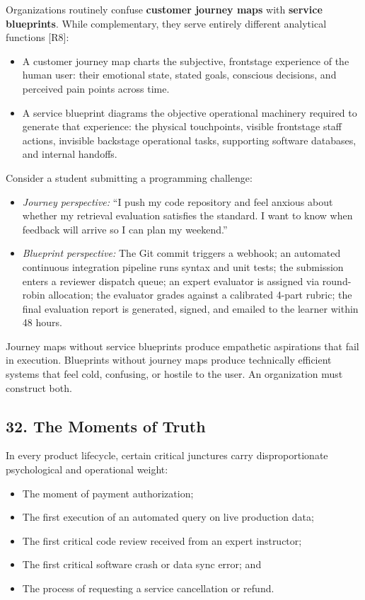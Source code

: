 Organizations routinely confuse \textbf{customer journey maps} with \textbf{service blueprints}. While complementary, they serve entirely different analytical functions [R8]:
\begin{itemize}
    \item A customer journey map charts the subjective, frontstage experience of the human user: their emotional state, stated goals, conscious decisions, and perceived pain points across time.
    \item A service blueprint diagrams the objective operational machinery required to generate that experience: the physical touchpoints, visible frontstage staff actions, invisible backstage operational tasks, supporting software databases, and internal handoffs.
\end{itemize}

Consider a student submitting a programming challenge:
\begin{itemize}
    \item \emph{Journey perspective:} ``I push my code repository and feel anxious about whether my retrieval evaluation satisfies the standard. I want to know when feedback will arrive so I can plan my weekend.''
    \item \emph{Blueprint perspective:} The Git commit triggers a webhook; an automated continuous integration pipeline runs syntax and unit tests; the submission enters a reviewer dispatch queue; an expert evaluator is assigned via round-robin allocation; the evaluator grades against a calibrated 4-part rubric; the final evaluation report is generated, signed, and emailed to the learner within 48 hours.
\end{itemize}

Journey maps without service blueprints produce empathetic aspirations that fail in execution. Blueprints without journey maps produce technically efficient systems that feel cold, confusing, or hostile to the user. An organization must construct both.

\subsection*{32. The Moments of Truth}

In every product lifecycle, certain critical junctures carry disproportionate psychological and operational weight:
\begin{itemize}
    \item The moment of payment authorization;
    \item The first execution of an automated query on live production data;
    \item The first critical code review received from an expert instructor;
    \item The first critical software crash or data sync error; and
    \item The process of requesting a service cancellation or refund.
\end{itemize}

